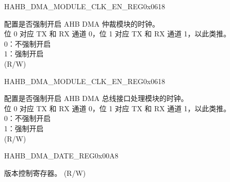 \begin{register}{H}{AHB\_DMA\_MODULE\_CLK\_EN\_REG}{0x0618}
\begin{regdesc}
\begin{reglist}
\label{fielddesc:AHBDMACMDARBCLKEN}\item [AHB\_DMA\_CMD\_ARB\_CLK\_EN] 配置是否强制开启 AHB DMA 仲裁模块的时钟。\\位 0 对应 TX 和 RX 通道 0，位 1 对应 TX 和 RX 通道 1，以此类推。\\0：不强制开启\\1：强制开启\\ (R/W)
\item [见下页...]
\end{reglist}\end{regdesc}
\end{register}

\addtocounter{Regfloat}{-1}
\begin{register}{H}{AHB\_DMA\_MODULE\_CLK\_EN\_REG}{0x0618}
\begin{regdesc}\begin{reglist}
\item [接上页...]
\label{fielddesc:AHBDMAAHBINFCLKEN}\item [AHB\_DMA\_AHBINF\_CLK\_EN] 配置是否强制开启 AHB DMA 总线接口处理模块的时钟。\\位 0 对应 TX 和 RX 通道 0，位 1 对应 TX 和 RX 通道 1，以此类推。\\0：不强制开启\\1：强制开启\\ (R/W)
\end{reglist}\end{regdesc}
\end{register}


\begin{register}{H}{AHB\_DMA\_DATE\_REG}{0x00A8}\label{regdesc:AHBDMADATEREG}
%
\regnewline%
\begin{regdesc}\begin{reglist}
\label{fielddesc:AHBDMADATE}\item [AHB\_DMA\_DATE] 版本控制寄存器。 (R/W)
\end{reglist}\end{regdesc}
\end{register}


